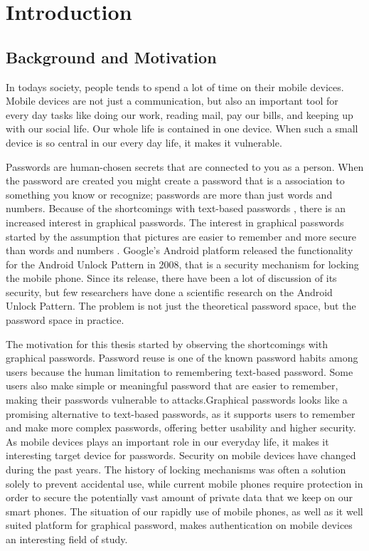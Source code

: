 \chapter{Introduction}

  \section{Background and Motivation}

  In todays society, people tends to spend a lot of time on their mobile devices. Mobile devices are not just a communication, but also an important tool for every day tasks like doing our work, reading mail, pay our bills, and keeping up with our social life. Our whole life is contained in one device. When such a small device is so central in our every day life, it makes it vulnerable.

  Passwords are human-chosen secrets that are connected to you as a person. When the password are created you might create a password that is a association to something you know or recognize; passwords are more than just words and numbers. Because of the shortcomings with text-based passwords \cite{UnixPasswords}, there is an increased interest in graphical passwords. The interest in graphical passwords started by the assumption that pictures are easier to remember and more secure than words and numbers \cite{DeAngeli}. Google's Android platform released the functionality for the Android Unlock Pattern in 2008, that is a security mechanism for locking the mobile phone. Since its release, there have been a lot of discussion of its security, but few researchers have done a scientific research on the Android Unlock Pattern. The problem is not just the theoretical password space, but the password space in practice. 

  The motivation for this thesis started by observing the shortcomings with graphical passwords. Password reuse is one of the known password habits among users because the human limitation to remembering text-based password. Some users also make simple or meaningful password that are easier to remember, making their passwords vulnerable to attacks.Graphical passwords looks like a promising alternative to text-based passwords, as it supports users to remember and make more complex passwords, offering better usability and higher security. As mobile devices plays an important role in our everyday life, it makes it interesting target device for passwords. Security on mobile devices have changed during the past years. The history of locking mechanisms was often a solution solely to prevent accidental use, while current mobile phones require protection in order to secure the potentially vast amount of private data that we keep on our smart phones. The situation of our rapidly use of mobile phones, as well as it well suited platform for graphical password, makes authentication on mobile devices an interesting field of study.


